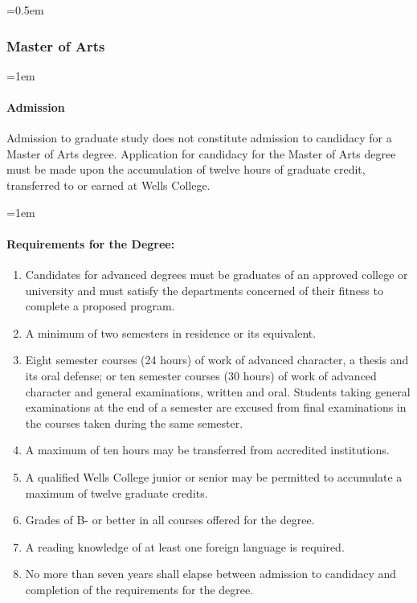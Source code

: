 \documentclass{manual}
\newcommand{\oldbreak}[1]{}
\let\oldsubsubsection\subsubsection
\renewcommand\subsubsection{\leftskip=0.5em\oldsubsubsection}
\let\oldparagraph\paragraph
\renewcommand\paragraph{\leftskip=1em\oldparagraph}
\newcommand{\itemLevelA}{\alph*.}
\newcommand{\itemRefA}{\alph*}
\begin{document}
\subsubsection{Master of Arts}

\paragraph{Admission} Admission to graduate study does not constitute admission to candidacy for a Master of Arts degree. Application for candidacy for the Master of Arts degree must be made upon the accumulation of twelve hours of graduate credit, transferred to or earned at Wells College.

\paragraph{Requirements for the Degree:}

\begin{enumerate}[label=\itemLevelA,ref=\itemRefA]

\item Candidates for advanced degrees must be graduates of an approved college or university and must satisfy the departments concerned of their fitness to complete a proposed program.

\item A minimum of two semesters in residence or its equivalent.

\item Eight semester courses (24 hours) of work of advanced character, a thesis and its oral defense; or ten semester courses (30 hours) of work of advanced character and general examinations, written and oral. Students taking general examinations at the end of a semester are excused from final examinations in the courses taken during the same semester.

\oldbreak{IV-2}

\item A maximum of ten hours may be transferred from accredited institutions.

\item A qualified Wells College junior or senior may be permitted to accumulate a maximum of twelve graduate credits.

\item Grades of B- or better in all courses offered for the degree.

\item A reading knowledge of at least one foreign language is required.

\item No more than seven years shall elapse between admission to candidacy and completion of the requirements for the degree.

\end{enumerate}
\end{document}
